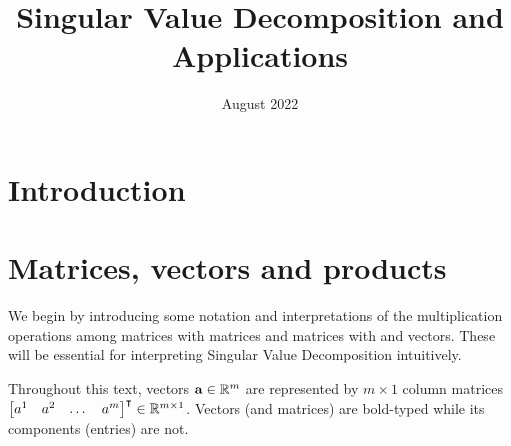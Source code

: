 \documentclass{article}
\title{Singular Value Decomposition and Applications}
\author{}
\date{August 2022}
\begin{document}
\maketitle

\section{Introduction}
\section{Matrices, vectors and products}

We begin by introducing some notation and interpretations of the multiplication operations among matrices with matrices and matrices with and vectors. These will be essential for interpreting Singular Value Decomposition intuitively. 

Throughout this text, vectors $\vb{a}\in\mathbb{R}^m$ are represented by $m\times 1$ column matrices $\mqty[a^1 & a^2 & \dots & a^m]^{\intercal}\in\mathbb{R}^{m \times 1} $. Vectors (and matrices) are bold-typed while its components (entries) are not. 
\end{document}
